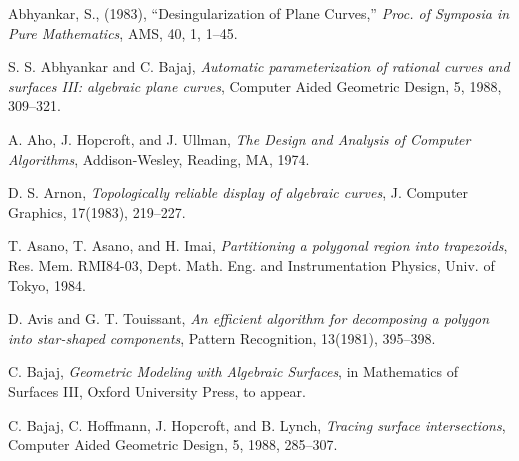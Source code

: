 \begin{thebibliography}{Abhyankar 87b}

 Abhyankar, S., (1983),
``Desingularization of Plane Curves,''
{\em Proc. of Symposia in Pure Mathematics}, AMS, 40, 1, 1--45.



 S. S. Abhyankar and C. Bajaj,
{\em Automatic parameterization of rational curves and surfaces III:
algebraic plane curves},
Computer Aided Geometric Design, 5, 1988, 309--321.


A. Aho, J. Hopcroft, and J. Ullman, 
{\em The Design and Analysis of Computer Algorithms},
Addison-Wesley, Reading, MA, 1974.

D. S. Arnon, {\em Topologically reliable display of algebraic curves},
J. Computer Graphics, 17(1983), 219--227.

T. Asano, T. Asano, and H. Imai,
{\em Partitioning a polygonal region into trapezoids},
Res. Mem. RMI84-03, Dept. Math. Eng. and Instrumentation Physics, Univ. of 
Tokyo, 1984.

D. Avis and G. T. Touissant,
{\em An efficient algorithm for decomposing a polygon into star-shaped
components},
Pattern Recognition, 13(1981), 395--398.


C. Bajaj,
{\em Geometric Modeling with Algebraic Surfaces},
in Mathematics of Surfaces III, Oxford University Press, to appear.

C. Bajaj, C. Hoffmann, J. Hopcroft, and B. Lynch,
{\em Tracing surface intersections},
Computer Aided Geometric Design, 5, 1988, 285--307.


\end{thebibliography}
